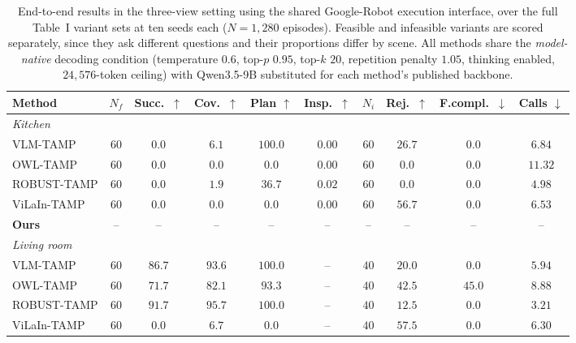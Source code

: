 \begin{table}[t]
\centering
\caption{End-to-end results in the three-view setting using the shared
Google-Robot execution interface, over the full Table~I variant sets at ten
seeds each ($N=1{,}280$ episodes). Feasible and infeasible variants are scored
separately, since they ask different questions and their proportions differ by
scene. All methods share the \emph{model-native} decoding condition
(temperature $0.6$, top-$p$ $0.95$, top-$k$ $20$, repetition penalty $1.05$,
thinking enabled, $24{,}576$-token ceiling) with Qwen3.5-9B substituted for each
method's published backbone.}
\label{tab:main_results}
\setlength{\tabcolsep}{4pt}
\scriptsize
\begin{tabular}{lccccccccc}
\toprule
Method & $N_f$ & Succ.\ $\uparrow$ & Cov.\ $\uparrow$ & Plan $\uparrow$ & Insp.\ $\uparrow$ & $N_i$ & Rej.\ $\uparrow$ & F.compl.\ $\downarrow$ & Calls $\downarrow$ \\
\midrule
\textit{Kitchen} & & & & & & & & & \\
VLM-TAMP & $60$ & $0.0$ & $6.1$ & $\mathbf{100.0}$ & $0.00$ & $60$ & $26.7$ & $0.0$ & $6.84$ \\
OWL-TAMP & $60$ & $0.0$ & $0.0$ & $0.0$ & $0.00$ & $60$ & $0.0$ & $0.0$ & $11.32$ \\
ROBUST-TAMP & $60$ & $0.0$ & $1.9$ & $36.7$ & $0.02$ & $60$ & $0.0$ & $0.0$ & $\mathbf{4.98}$ \\
ViLaIn-TAMP & $60$ & $0.0$ & $0.0$ & $0.0$ & $0.00$ & $60$ & $\mathbf{56.7}$ & $0.0$ & $6.53$ \\
\textbf{Ours} & -- & -- & -- & -- & -- & -- & -- & -- & -- \\
\midrule
\textit{Living room} & & & & & & & & & \\
VLM-TAMP & $60$ & $86.7$ & $93.6$ & $\mathbf{100.0}$ & -- & $40$ & $20.0$ & $0.0$ & $5.94$ \\
OWL-TAMP & $60$ & $71.7$ & $82.1$ & $93.3$ & -- & $40$ & $42.5$ & $45.0$ & $8.88$ \\
ROBUST-TAMP & $60$ & $\mathbf{91.7}$ & $\mathbf{95.7}$ & $\mathbf{100.0}$ & -- & $40$ & $12.5$ & $0.0$ & $\mathbf{3.21}$ \\
ViLaIn-TAMP & $60$ & $0.0$ & $6.7$ & $0.0$ & -- & $40$ & $\mathbf{57.5}$ & $0.0$ & $6.30$ \\

\end{tabular}
\end{table}
